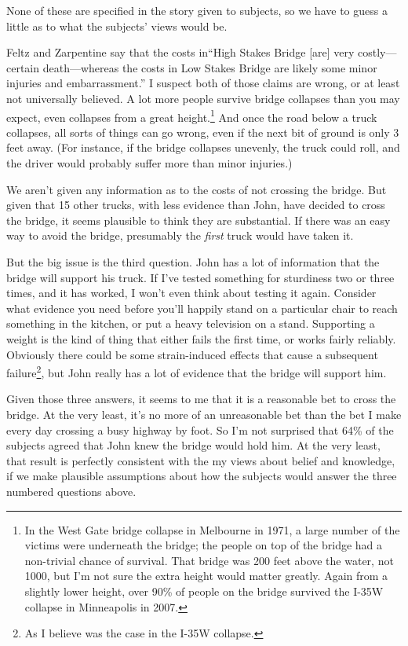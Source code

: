 None of these are specified in the story given to subjects, so we have to guess a little as to what the subjects' views would be. 

Feltz and Zarpentine say that the costs in``High Stakes Bridge [are] very costly---certain death---whereas the costs in Low Stakes Bridge are likely some minor injuries and embarrassment.'' \cite[??]{FeltzZarpentine2010} I suspect both of those claims are wrong, or at least not universally believed. A lot more people survive bridge collapses than you may expect, even collapses from a great height.\footnote{In the West Gate bridge collapse in Melbourne in 1971, a large number of the victims were underneath the bridge; the people on top of the bridge had a non-trivial chance of survival. That bridge was 200 feet above the water, not 1000, but I'm not sure the extra height would matter greatly. Again from a slightly lower height, over 90\% of people on the bridge survived the I-35W collapse in Minneapolis in 2007.} And once the road below a truck collapses, all sorts of things can go wrong, even if the next bit of ground is only 3 feet away. (For instance, if the bridge collapses unevenly, the truck could roll, and the driver would probably suffer more than minor injuries.)

We aren't given any information as to the costs of not crossing the bridge. But given that 15 other trucks, with less evidence than John, have decided to cross the bridge, it seems plausible to think they are substantial. If there was an easy way to avoid the bridge, presumably the \textit{first} truck would have taken it.

But the big issue is the third question. John has a lot of information that the bridge will support his truck. If I've tested something for sturdiness two or three times, and it has worked, I won't even think about testing it again. Consider what evidence you need before you'll happily stand on a particular chair to reach something in the kitchen, or put a heavy television on a stand. Supporting a weight is the kind of thing that either fails the first time, or works fairly reliably. Obviously there could be some strain-induced effects that cause a subsequent failure\footnote{As I believe was the case in the I-35W collapse.}, but John really has a lot of evidence that the bridge will support him.

Given those three answers, it seems to me that it is a reasonable bet to cross the bridge. At the very least, it's no more of an unreasonable bet than the bet I make every day crossing a busy highway by foot. So I'm not surprised that 64\% of the subjects agreed that John knew the bridge would hold him. At the very least, that result is perfectly consistent with the my views about belief and knowledge, if we make plausible assumptions about how the subjects would answer the three numbered questions above.

